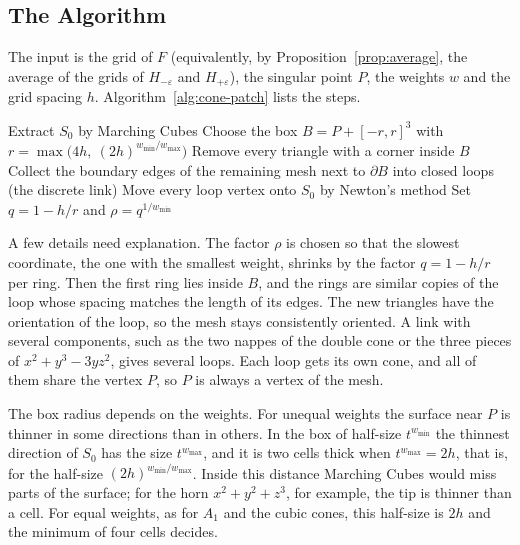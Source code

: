 \documentclass[12pt, a4paper, oneside]{book}
\theoremstyle{plain}
\theoremstyle{definition}
\theoremstyle{remark}
\theoremstyle{definition}
\begin{document}
\subsection{The Algorithm}
\label{sec:r-cone-algorithm}

The input is the grid of $F$ (equivalently, by Proposition~\ref{prop:average}, the average of the grids of $H_{-\varepsilon}$ and $H_{+\varepsilon}$), the singular point $P$, the weights $w$ and the grid spacing $h$. Algorithm~\ref{alg:cone-patch} lists the steps.

\begin{algorithm}[!ht]
\DontPrintSemicolon
{}
Extract $S_0$ by Marching Cubes\;
Choose the box $B=P+[-r,r]^3$ with $r=\max\big(4h,\ (2h)^{w_{\min}/w_{\max}}\big)$\;
Remove every triangle with a corner inside $B$\;
Collect the boundary edges of the remaining mesh next to $\partial B$ into closed loops (the discrete link)\;
Move every loop vertex onto $S_0$ by Newton's method\;
Set $q=1-h/r$ and $\rho=q^{1/w_{\min}}$\;
\caption{The weighted cone patch}
\label{alg:cone-patch}
\end{algorithm}

A few details need explanation. The factor $\rho$ is chosen so that the slowest coordinate, the one with the smallest weight, shrinks by the factor $q=1-h/r$ per ring. Then the first ring lies inside $B$, and the rings are similar copies of the loop whose spacing matches the length of its edges. The new triangles have the orientation of the loop, so the mesh stays consistently oriented. A link with several components, such as the two nappes of the double cone or the three pieces of $x^2+y^3-3yz^2$, gives several loops. Each loop gets its own cone, and all of them share the vertex $P$, so $P$ is always a vertex of the mesh.

The box radius depends on the weights. For unequal weights the surface near $P$ is thinner in some directions than in others. In the box of half-size $t^{w_{\min}}$ the thinnest direction of $S_0$ has the size $t^{w_{\max}}$, and it is two cells thick when $t^{w_{\max}}=2h$, that is, for the half-size $(2h)^{w_{\min}/w_{\max}}$. Inside this distance Marching Cubes would miss parts of the surface; for the horn $x^2+y^2+z^3$, for example, the tip is thinner than a cell. For equal weights, as for $A_1$ and the cubic cones, this half-size is $2h$ and the minimum of four cells decides.
\end{document}
